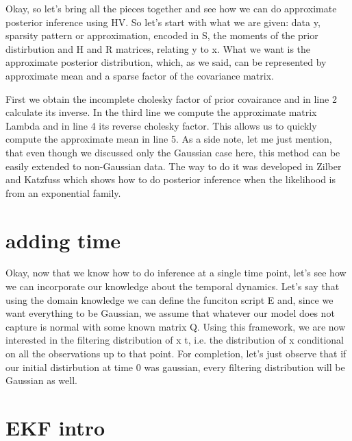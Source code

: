 \documentclass[12pt]{article} %
\begin{document}
Okay, so let's bring all the pieces together and see how we can do approximate posterior inference using HV. So let's start with what we are given: data y, sparsity pattern or approximation, encoded in S, the moments of the prior distirbution and H and R matrices, relating y to x. What we want is the approximate posterior distribution, which, as we said, can be represented by approximate mean and a sparse factor of the covariance matrix.

First we obtain the incomplete cholesky factor of prior covairance and in line 2 calculate its inverse. In the third line we compute the approximate matrix Lambda and in line 4 its reverse cholesky factor. This allows us to quickly compute the approximate mean in line 5. As a side note, let me just mention, that even though we discussed only the Gaussian case here, this method can be easily extended to non-Gaussian data. The way to do it was developed in Zilber and Katzfuss which shows how to do posterior inference when the likelihood is from an exponential family.



\newpage
\section*{adding time}




Okay, now that we know how to do inference at a single time point, let's see how we can incorporate our knowledge about the temporal dynamics. Let's say that using the domain knowledge we can define the funciton script E and, since we want everything to be Gaussian, we assume that whatever our model does not capture is normal with some known matrix Q. Using this framework, we are now interested in the filtering distribution of x t, i.e. the distribution of x conditional on all the observations up to that point. For completion, let's just observe that if our initial distirbution at time 0 was gaussian, every filtering distribution will be Gaussian as well. 


\newpage
\section*{EKF intro}
\end{document}
